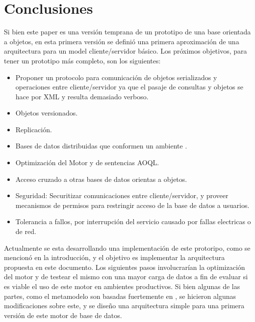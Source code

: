 \documentclass{melta}
\begin{document}
\section{Conclusiones}
\label{sec:conc}
Si bien este paper es una versión temprana de un prototipo de una base orientada a objetos, en esta primera versión se definió una primera aproximación de una arquitectura para un model cliente/servidor básico. Los próximos objetivos, para tener un prototipo más completo, son los siguientes:

\begin{itemize}
\item Proponer un protocolo para comunicación de objetos serializados y operaciones entre cliente/servidor ya que el pasaje de consultas y objetos se hace por XML y resulta demasiado verboso.
\item Objetos versionados.
\item Replicación.
\item Bases de datos distribuidas que conformen un ambiente \cite{ODRA:sub}.
\item Optimización del Motor y de sentencias AOQL.
\item Acceso cruzado a otras bases de datos orientas a objetos.
\item Seguridad: Securitizar comunicaciones entre cliente/servidor, y proveer mecanismos de permisos para restringir acceso de la base de datos a usuarios.
\item Tolerancia a fallos, por interrupción del servicio causado por fallas electricas o de red.
\end{itemize}

Actualmente se esta desarrollando una implementación de este protoripo, como se mencionó en la introducción, y el objetivo es implementar la arquitectura propuesta en este documento. Los siguientes pasos involucrarían la optimización del motor y de testear el mismo con una mayor carga de datos a fin de evaluar si es viable el uso de este motor en ambientes productivos. 
Si bien algunas de las partes, como el metamodelo son basadas fuertemente en \cite{OMG:oodbs}, se hicieron algunas modificaciones sobre este, y se diseño una arquitectura simple para una primera versión de este motor de base de datos. 


\balance

\end{document}
